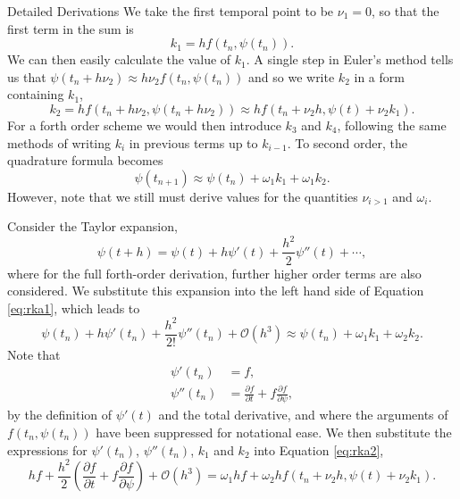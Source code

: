 \begin{chapter}{Detailed Derivations\label{app:App2}}
We take the first temporal point to be $\nu_1=0$, so that the first term in the sum is
\begin{equation*}
k_1 = hf(t_n,\psi(t_n)).
\end{equation*}
We can then easily calculate the value of $k_1$. A single step in Euler's method tells us that $\psi(t_n+h\nu_2) \approx h\nu_2f(t_n,\psi(t_n))$ and so we write $k_2$ in a form containing $k_1$,
\begin{equation*}
k_2 = hf(t_n+h\nu_2,\psi(t_n+h\nu_2)) \approx hf(t_n+\nu_2h,\psi(t)+\nu_2k_1).
\end{equation*}
For a forth order scheme we would then introduce $k_3$ and $k_4$, following the same methods of writing $k_i$ in previous terms up to $k_{i-1}$. To second order, the quadrature formula becomes
\begin{equation}
\psi(t_{n+1}) \approx \psi(t_n) + \omega_1k_1 + \omega_1k_2.
\end{equation}\label{eq:rka1}
However, note that we still must derive values for the quantities $\nu_{i>1}$ and $\omega_i$.

Consider the Taylor expansion,
\begin{equation*}
\psi(t+h) = \psi(t) + h\psi'(t) + \frac{h^2}{2}\psi''(t) + \cdots,
\end{equation*}
where for the full forth-order derivation, further higher order terms are also considered. We substitute this expansion into the left hand side of Equation \ref{eq:rka1}, which leads to
\begin{equation}
\psi(t_n) + h\psi'(t_n) + \frac{h^2}{2!}\psi''(t_n) + \mathcal{O}(h^3) \approx \psi(t_n) + \omega_1k_1 + \omega_2k_2.
\end{equation}\label{eq:rka2}
Note that
\begin{align*}
\psi'(t_n)  &= f,\\
\psi''(t_n) &= \frac{\partial f}{\partial t} + f\frac{\partial f}{\partial \psi},
\end{align*}
by the definition of $\psi'(t)$ and the total derivative, and where the arguments of $f(t_n,\psi(t_n))$ have been suppressed for notational ease. We then substitute the expressions for $\psi'(t_n)$, $\psi''(t_n)$, $k_1$ and $k_2$ into Equation \ref{eq:rka2},
\begin{equation}
hf + \frac{h^2}{2}\left(\frac{\partial f}{\partial t} + f\frac{\partial f}{\partial \psi}\right) + \mathcal{O}(h^3) = \omega_1hf + \omega_2hf(t_n+\nu_2h,\psi(t)+\nu_2k_1).
\end{equation}\label{eq:rka3}


\end{chapter}
